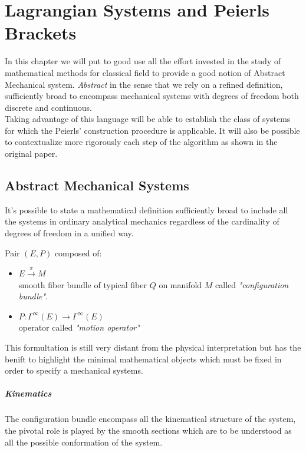 \documentclass[Main]{subfiles}
\begin{document}
\chapter{Lagrangian Systems and Peierls Brackets}
  In this chapter we will put to good use all the effort invested in the study of mathematical methods for classical field to provide a good notion of Abstract Mechanical system. 
  \emph{Abstract} in the sense that we rely on a refined definition, sufficiently broad to encompass mechanical systems with degrees of freedom both discrete and continuous.
  \\
  Taking advantage of this language will be able to establish the class of systems for which the Peierls' construction procedure  is applicable.
  It will also be possible to contextualize more rigorously each step of the algorithm as shown in the original paper\cite{Peierls1952}.
   
	\section{Abstract Mechanical Systems}
	It's possible to state a mathematical definition sufficiently broad to include all the systems in ordinary analytical mechanics regardless of the cardinality of degrees of freedom  in a unified way.
	
	\begin{definition}
		Pair $(E,P )$ composed of:
		\begin{itemize}
			\item $E \xrightarrow{\pi} M$ \\smooth fiber bundle of typical fiber $Q$ on  manifold $M$ called \emph{"configuration bundle"}.
			\item	$ P : \Gamma^\infty(E) \rightarrow \Gamma^\infty(E)$ \\  operator called \emph{"motion operator"}
		\end{itemize}
	\end{definition}
	This formultation is still very distant from the physical interpretation but has the benift to highlight the minimal mathematical objects which must be fixed in order to specify a mechanical systems.
	
	
	\paragraph{Kinematics}
	The configuration bundle encompass all the kinematical structure of the system, the pivotal role is played by the smooth sections  which are to be understood as all the possible conformation of the system.
\end{document}
